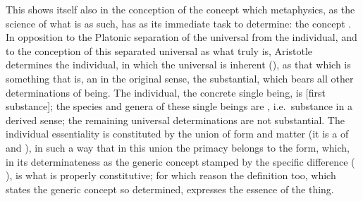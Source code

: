 This shows itself also in the conception of the concept which metaphysics, as the science of what is as such, has
as its immediate task to determine: the concept . In opposition to the Platonic separation of the universal from the
individual, and to the conception of this separated universal as what
truly is, Aristotle determines the individual, in which
the universal is inherent (), as that which is something that is, an  in the original sense, the substantial, which
bears all other determinations of being. The individual, the
concrete single being, is  [first substance]; the species and genera of these single beings
are , i.e.\ substance in a derived sense; the remaining universal determinations are not substantial.
The individual essentiality is constituted by the union of form and matter (it is a  of  and ),
in such a way that in this union the primacy belongs to the form,
which, in its determinateness as the generic concept stamped by the specific difference (
), is what is properly constitutive;
for which reason the definition too, which states the generic concept so
determined, expresses the essence of the thing.

